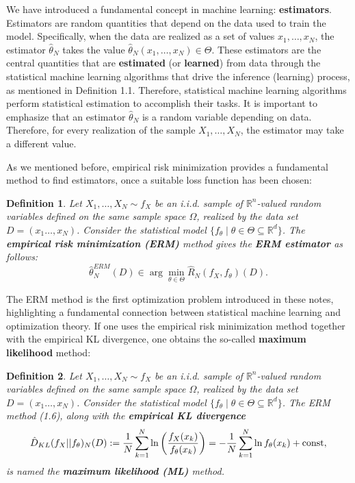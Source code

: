 \documentclass{report}
\newtheorem{definition}{Definition}[chapter]
\begin{document}
We have introduced a fundamental concept in machine learning: \textbf{estimators}. Estimators are random quantities that depend on the data used to train the model. Specifically, when the data are realized as a set of values $x_1,\dots,x_N$, the estimator $\hat{\theta}_N$ takes the value $\hat{\theta}_N(x_1,\dots,x_N) \in \Theta$. These estimators are the central quantities that are \textbf{estimated} (or \textbf{learned}) from data through the statistical machine learning algorithms that drive the inference (learning) process, as mentioned in Definition 1.1. Therefore, statistical machine learning algorithms perform statistical estimation to accomplish their tasks. It is important to emphasize that an estimator $\hat{\theta}_N$ is a random variable depending on data. Therefore, for
every realization of the sample $X_1,\dots,X_N$, the estimator may take a different value.

As we mentioned before, empirical risk minimization provides a fundamental method to find estimators, once a suitable loss function has been chosen:
\begin{definition}
Let $X_1,\dots,X_N \sim f_X$ be an i.i.d. sample of $\mathbb{R}^n$-valued random variables defined on the same sample space $\Omega$, realized by the data set $D =(x_1\dots,x_N)$. Consider the statistical model $\{f_\theta \mid \theta \in \Theta \subseteq \mathbb{R}^d\}$. The \textbf{empirical risk minimization (ERM)} method gives the \textbf{ERM estimator} as follows:
\begin{equation}
\hat{\theta}^{ERM}_N(D) \in \arg\min_{\theta \in \Theta}\hat{R}_N(f_X,f_\theta)(D).
\end{equation}
\end{definition}

The ERM method is the first optimization problem introduced in these notes, highlighting a fundamental connection between statistical machine learning and optimization theory. If one uses the empirical risk minimization method together with the empirical KL divergence, one obtains the so-called \textbf{maximum likelihood} method:

\begin{definition}
Let $X_1,\dots,X_N \sim f_X$ be an i.i.d. sample of $\mathbb{R}^n$-valued random variables defined on the same sample space $\Omega$, realized by the data set $D=(x_1\dots,x_N)$. Consider the statistical model $\{f_\theta \mid \theta \in \Theta \subseteq \mathbb{R}^d\}$. The ERM method (1.6), along with the \textbf{empirical KL divergence}
\begin{equation}
\hat{D}_{KL}(f_X||f_\theta)_N(D) := \frac{1}{N} \sum_{k=1}^{N} \ln \left(\frac{f_X(x_k)}{f_\theta(x_k)}\right) = -\frac{1}{N} \sum_{k=1}^{N} \ln  f_\theta(x_k) + \textup{const},
\end{equation}
is named the \textbf{maximum likelihood (ML)} method.
\end{definition}
\end{document}
